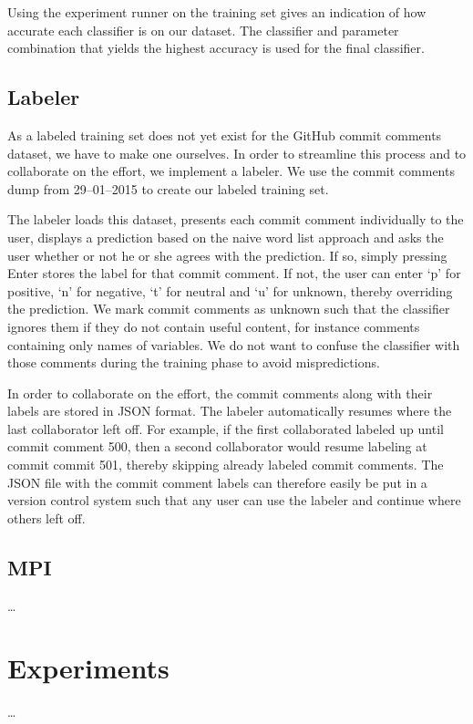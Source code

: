 \documentclass{article}
\begin{document}
Using the experiment runner on the training set gives an indication of
how accurate each classifier is on our dataset. The classifier and
parameter combination that yields the highest accuracy is used for the
final classifier.

\subsection{Labeler}\label{sec:labeler}
As a labeled training set does not yet exist for the GitHub commit comments
dataset, we have to make one ourselves. In order to streamline this process
and to collaborate on the effort, we implement a labeler. We use the commit
comments dump from 29--01--2015 to create our labeled training set.

The labeler loads this dataset, presents each commit comment individually to
the user, displays a prediction based on the naive word list approach and asks
the user whether or not he or she agrees with the prediction. If so, simply
pressing Enter stores the label for that commit comment. If not, the user
can enter `p' for positive, `n' for negative, `t' for neutral and `u' for
unknown, thereby overriding the prediction. We mark commit comments as unknown
such that the classifier ignores them if they do not contain useful content,
for instance comments containing only names of variables. We do not want to
confuse the classifier with those comments during the training phase to avoid
mispredictions.

In order to collaborate on the effort, the commit comments along with their
labels are stored in JSON format. The labeler automatically resumes where
the last collaborator left off. For example, if the first collaborated labeled
up until commit comment 500, then a second collaborator would resume labeling
at commit commit 501, thereby skipping already labeled commit comments. The
JSON file with the commit comment labels can therefore easily be put in a
version control system such that any user can use the labeler and continue 
where others left off.

\subsection{MPI}\label{sec:mpi}
\ldots

\section{Experiments}\label{sec:experiments}
\ldots
\end{document}
